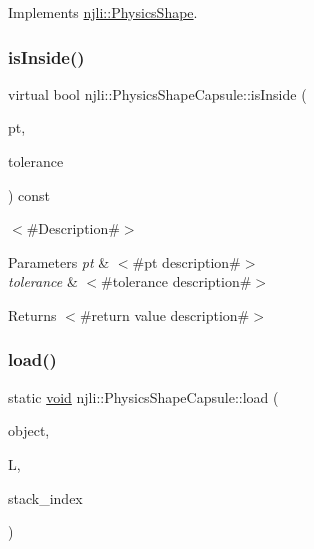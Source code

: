 Implements \mbox{\hyperlink{classnjli_1_1_physics_shape_acb05a16bdbfa5cee6dcbab5c253eb78e}{njli\+::\+Physics\+Shape}}.

\mbox{\label{classnjli_1_1_physics_shape_capsule_a68c39b5cf57194cff15a904d3a944e3c}} 
\subsubsection{\texorpdfstring{is\+Inside()}{isInside()}}
{\footnotesize\ttfamily virtual bool njli\+::\+Physics\+Shape\+Capsule\+::is\+Inside (\begin{DoxyParamCaption}\item[{const bt\+Vector3 \&}]{pt,  }\item[{\mbox{\hyperlink{_util_8h_a5f6906312a689f27d70e9d086649d3fd}{f32}}}]{tolerance }\end{DoxyParamCaption}) const\hspace{0.3cm}{\ttfamily [virtual]}}

$<$\#\+Description\#$>$


\begin{DoxyParams}{Parameters}
{\em pt} & $<$\#pt description\#$>$ \\
\hline
{\em tolerance} & $<$\#tolerance description\#$>$\\
\hline
\end{DoxyParams}
\begin{DoxyReturn}{Returns}
$<$\#return value description\#$>$ 
\end{DoxyReturn}
\mbox{\label{classnjli_1_1_physics_shape_capsule_ae4e2004100028feb7f7af4c9dab34569}} 
\subsubsection{\texorpdfstring{load()}{load()}}
{\footnotesize\ttfamily static \mbox{\hyperlink{_thread_8h_af1e856da2e658414cb2456cb6f7ebc66}{void}} njli\+::\+Physics\+Shape\+Capsule\+::load (\begin{DoxyParamCaption}\item[{\mbox{\hyperlink{classnjli_1_1_physics_shape_capsule}{Physics\+Shape\+Capsule}} \&}]{object,  }\item[{lua\+\_\+\+State $\ast$}]{L,  }\item[{int}]{stack\+\_\+index }\end{DoxyParamCaption})\hspace{0.3cm}{\ttfamily [static]}}

